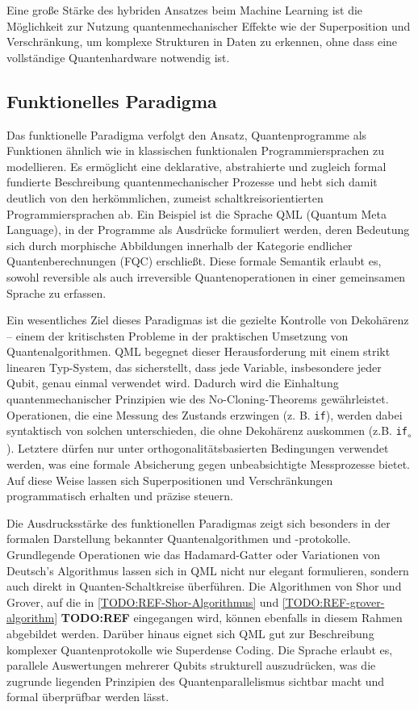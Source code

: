 Eine große Stärke des hybriden Ansatzes beim Machine Learning ist die Möglichkeit zur Nutzung quantenmechanischer Effekte wie der Superposition und Verschränkung, um komplexe Strukturen in Daten zu erkennen, ohne dass eine vollständige Quantenhardware notwendig ist. \autocite[2-4]{alchieri_introduction_2021}

\subsection{Funktionelles Paradigma}

Das funktionelle Paradigma verfolgt den Ansatz, Quantenprogramme als Funktionen ähnlich wie in klassischen funktionalen Programmiersprachen zu modellieren. Es ermöglicht eine deklarative, abstrahierte und zugleich formal fundierte Beschreibung quantenmechanischer Prozesse und hebt sich damit deutlich von den herkömmlichen, zumeist schaltkreisorientierten Programmiersprachen ab. Ein Beispiel ist die Sprache QML (Quantum Meta Language), in der Programme als Ausdrücke formuliert werden, deren Bedeutung sich durch morphische Abbildungen innerhalb der Kategorie endlicher Quantenberechnungen (FQC) erschließt. Diese formale Semantik erlaubt es, sowohl reversible als auch irreversible Quantenoperationen in einer gemeinsamen Sprache zu erfassen.

Ein wesentliches Ziel dieses Paradigmas ist die gezielte Kontrolle von Dekohärenz -- einem der kritischsten Probleme in der praktischen Umsetzung von Quantenalgorithmen. QML begegnet dieser Herausforderung mit einem strikt linearen Typ-System, das sicherstellt, dass jede Variable, insbesondere jeder Qubit, genau einmal verwendet wird. Dadurch wird die Einhaltung quantenmechanischer Prinzipien wie des No-Cloning-Theorems gewährleistet. Operationen, die eine Messung des Zustands erzwingen (z. B. \texttt{if}), werden dabei syntaktisch von solchen unterschieden, die ohne Dekohärenz auskommen (z.B. \texttt{if\textsubscript{$\circ$}}). Letztere dürfen nur unter orthogonalitätsbasierten Bedingungen verwendet werden, was eine formale Absicherung gegen unbeabsichtigte Messprozesse bietet. Auf diese Weise lassen sich Superpositionen und Verschränkungen programmatisch erhalten und präzise steuern.

Die Ausdrucksstärke des funktionellen Paradigmas zeigt sich besonders in der formalen Darstellung bekannter Quantenalgorithmen und -protokolle. Grundlegende Operationen wie das Hadamard-Gatter oder Variationen von Deutsch's Algorithmus lassen sich in QML nicht nur elegant formulieren, sondern auch direkt in Quanten-Schaltkreise überführen. Die Algorithmen von Shor und Grover, auf die in \autoref{TODO:REF-Shor-Algorithmus} und \autoref{TODO:REF-grover-algorithm} \textbf{TODO:REF} eingegangen wird, können ebenfalls in diesem Rahmen abgebildet werden. Darüber hinaus eignet sich QML gut zur Beschreibung komplexer Quantenprotokolle wie Superdense Coding. Die Sprache erlaubt es, parallele Auswertungen mehrerer Qubits strukturell auszudrücken, was die zugrunde liegenden Prinzipien des Quantenparallelismus sichtbar macht und formal überprüfbar werden lässt.

